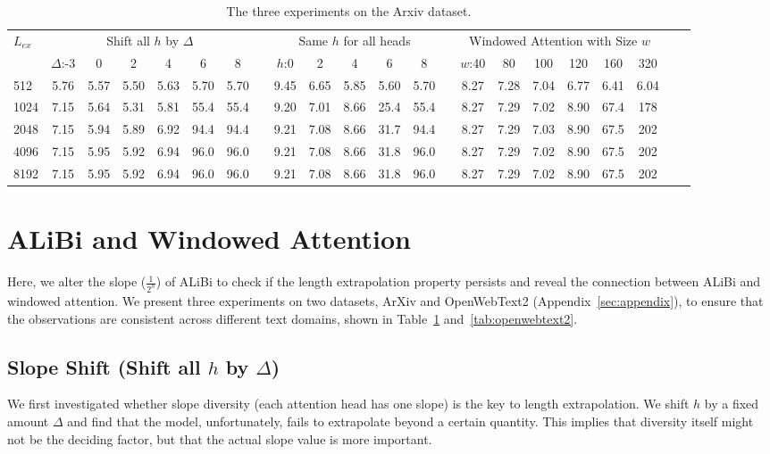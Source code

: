\documentclass[11pt]{article}
\theoremstyle{plain}
\begin{document}
\begin{table}[!ht]
    \setlength{\tabcolsep}{2pt}
    \hspace{-7mm}
    \begin{tabular}{@{\extracolsep{3pt}}lccccccccccccccccccccc}
    \hline\hline
    \multirow{2}{*}{$L_{ex}$} & \multicolumn{6}{c}{Shift all $h$ by $\Delta$ } & & \multicolumn{5}{c}{Same $h$ for all heads} & & \multicolumn{6}{c}{Windowed Attention with Size $w$} \\
     \cline{2-7} \cline{9-13} \cline{15-20} &
     $\Delta$:-3 & 0 & 2 & 4 & 6 & 8 & & $h$:0 & 2 & 4 & 6 & 8 & & $w$:40 & 80 & 100 & 120 & 160 & 320 \\
    \hline
    512 & 5.76 & 5.57 & 5.50 & 5.63 & 5.70 & 5.70 & & 9.45 & 6.65 & 5.85 & 5.60 & 5.70 & & 8.27 & 7.28 & 7.04 & 6.77 & 6.41 & 6.04 \\
    1024 & 7.15 & 5.64 & 5.31 & 5.81 & 55.4 & 55.4 & & 9.20 & 7.01 & 8.66 & 25.4 & 55.4 & & 8.27 & 7.29 & 7.02 & 8.90 & 67.4 & 178 \\
    2048 & 7.15 & 5.94 & 5.89 & 6.92 & 94.4 & 94.4 & & 9.21 & 7.08 & 8.66 & 31.7 & 94.4 & & 8.27 & 7.29 & 7.03 & 8.90 & 67.5 & 202 \\
    4096 & 7.15 & 5.95 & 5.92 & 6.94 & 96.0 & 96.0 & & 9.21 & 7.08 & 8.66 & 31.8 & 96.0 & & 8.27 & 7.29 & 7.02 & 8.90 & 67.5 & 202 \\
    8192 & 7.15 & 5.95 & 5.92 & 6.94 & 96.0 & 96.0 & & 9.21 & 7.08 & 8.66 & 31.8 & 96.0 & & 8.27 & 7.29 & 7.02 & 8.90 & 67.5 & 202 \\
    \hline\hline
    \end{tabular}
    \caption{The three experiments on the Arxiv dataset.}
    \label{tab:arxiv}
\end{table}

\section{ALiBi and Windowed Attention}
\label{sec:three_exps}
Here, we alter the slope ($\frac{1}{2^h}$) of ALiBi to check if the length extrapolation property persists and reveal the connection between ALiBi and windowed attention. 
We present three experiments on two datasets, ArXiv and OpenWebText2 (Appendix~\ref{sec:appendix}), to ensure that the observations are consistent across different text domains, shown in Table~\ref{tab:arxiv} and~\ref{tab:openwebtext2}.
 
\subsection{Slope Shift (Shift all $h$ by $\Delta$)} 
We first investigated whether slope diversity (each attention head has one slope) is the key to length extrapolation. We shift $h$ by a fixed amount $\Delta$ and find that the model, unfortunately, fails to extrapolate beyond a certain quantity. 
This implies that diversity itself might not be the deciding factor, but that the actual slope value is more important.
\end{document}

